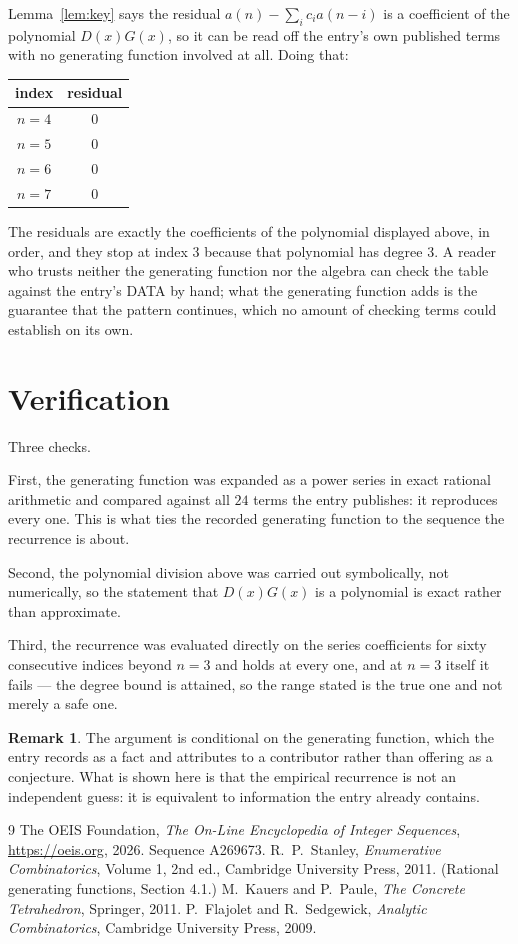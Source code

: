 \documentclass[11pt,a4paper]{article}
\theoremstyle{plain}
\theoremstyle{definition}
\newtheorem{remark}[theorem]{Remark}
\begin{document}
Lemma~\ref{lem:key} says the residual $a(n)-\sum_ic_ia(n-i)$ is a coefficient of the
polynomial $D(x)G(x)$, so it can be read off the entry's own published terms with no
generating function involved at all. Doing that:
\begin{center}
\begin{tabular}{cc}
index & residual \\ \hline
$n=4$ & $0$ \\
$n=5$ & $0$ \\
$n=6$ & $0$ \\
$n=7$ & $0$
\end{tabular}
\end{center}
The residuals are exactly the coefficients of the polynomial displayed above, in order, and
they stop at index $3$ because that polynomial has degree $3$. A reader who trusts
neither the generating function nor the algebra can check the table against the entry's DATA
by hand; what the generating function adds is the guarantee that the pattern continues, which
no amount of checking terms could establish on its own.

\section{Verification}

Three checks.

First, the generating function was expanded as a power series in exact rational arithmetic and
compared against all $24$ terms the entry publishes: it reproduces every one. This is
what ties the recorded generating function to the sequence the recurrence is about.

Second, the polynomial division above was carried out symbolically, not numerically, so the
statement that $D(x)G(x)$ is a polynomial is exact rather than approximate.

Third, the recurrence was evaluated directly on the series coefficients for sixty consecutive
indices beyond $n=3$ and holds at every one, and at $n=3$ itself it fails --- the
degree bound is attained, so the range stated is the true one and not merely a safe one.

\begin{remark}
The argument is conditional on the generating function, which the entry records as a fact and
attributes to a contributor rather than offering as a conjecture. What is shown here is that
the empirical recurrence is not an independent guess: it is equivalent to information the
entry already contains.
\end{remark}

\begin{thebibliography}{9}
 The OEIS Foundation, \emph{The On-Line Encyclopedia of Integer
Sequences}, \url{https://oeis.org}, 2026. Sequence A269673.
 R.~P.~Stanley, \emph{Enumerative Combinatorics}, Volume 1, 2nd ed.,
Cambridge University Press, 2011. (Rational generating functions, Section 4.1.)
 M.~Kauers and P.~Paule, \emph{The Concrete Tetrahedron}, Springer, 2011.
 P.~Flajolet and R.~Sedgewick, \emph{Analytic Combinatorics}, Cambridge
University Press, 2009.
\end{thebibliography}
\end{document}
